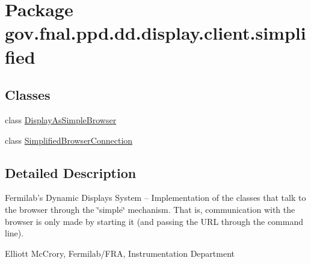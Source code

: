 \hypertarget{namespacegov_1_1fnal_1_1ppd_1_1dd_1_1display_1_1client_1_1simplified}{\section{Package gov.\-fnal.\-ppd.\-dd.\-display.\-client.\-simplified}
\label{namespacegov_1_1fnal_1_1ppd_1_1dd_1_1display_1_1client_1_1simplified}
}
\subsection*{Classes}
\begin{DoxyCompactItemize}
\item 
class \hyperlink{classgov_1_1fnal_1_1ppd_1_1dd_1_1display_1_1client_1_1simplified_1_1DisplayAsSimpleBrowser}{Display\-As\-Simple\-Browser}
\item 
class \hyperlink{classgov_1_1fnal_1_1ppd_1_1dd_1_1display_1_1client_1_1simplified_1_1SimplifiedBrowserConnection}{Simplified\-Browser\-Connection}
\end{DoxyCompactItemize}


\subsection{Detailed Description}
Fermilab's Dynamic Displays System -- Implementation of the classes that talk to the browser through the \char`\"{}simple\char`\"{} mechanism. That is, communication with the browser is only made by starting it (and passing the U\-R\-L through the command line). 

Elliott Mc\-Crory, Fermilab/\-F\-R\-A, Instrumentation Department 
